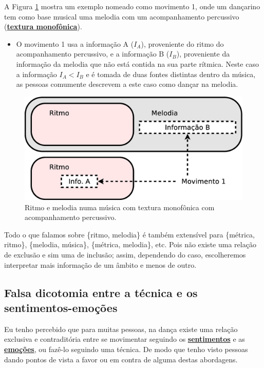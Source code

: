\begin{example}
\label{ex:ritmovsmelodia2}
A Figura \ref{fig:ritmo-melodia-2} mostra um exemplo nomeado como movimento 1,
onde um dançarino tem como base musical uma melodia com um acompanhamento percussivo 
(\hyperref[subsec:monofonica]{\textbf{textura monofônica}}).
\begin{itemize}
\item O movimento 1 usa a informação A ($I_{A}$), proveniente do ritmo do acompanhamento percussivo,
e a informação B ($I_{B}$), proveniente da informação da melodia que não está contida na sua parte rítmica.
Neste caso a informação $I_A < I_B$ e é tomada de duas fontes distintas dentro da música, 
 as pessoas comumente descrevem a este caso como dançar na melodia. 
\end{itemize}
\end{example}
\begin{figure}[h!]
\centering
      \includegraphics[width=.6\linewidth]{chapters/cap-musicalidade-tecnica/ritmo-melodia-2}  
      \caption{Ritmo e melodia numa música com textura monofônica com acompanhamento percussivo.}
      \label{fig:ritmo-melodia-2}
\end{figure}



Todo o que falamos sobre  \{ritmo, melodia\} é também extensível para 
\{métrica, ritmo\}, \{melodia, música\}, \{métrica, melodia\}, etc.
Pois não existe uma relação de exclusão e sim uma de inclusão;
assim, dependendo do caso, 
escolheremos interpretar mais informação de um âmbito e menos de outro.







\subsection{Falsa dicotomia entre a técnica e os sentimentos-emoções}
\label{subsec:tecnica-sentimentos}
Eu tenho percebido que para muitas pessoas, na dança existe uma relação exclusiva e contraditória 
entre se movimentar seguindo os \hyperref[subsec:filling]{\textbf{sentimentos}} e as 
\hyperref[subsec:emotion]{\textbf{emoções}},
ou fazê-lo seguindo uma técnica. 
De modo que tenho visto pessoas dando pontos de vista a favor ou em contra de alguma destas abordagens.

